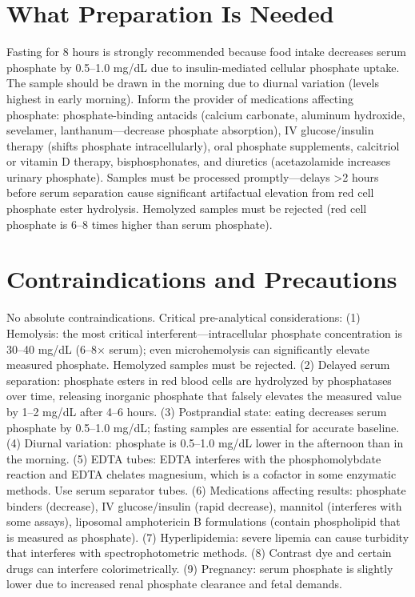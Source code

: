 \section*{What Preparation Is Needed}
Fasting for 8 hours is strongly recommended because food intake decreases serum phosphate by 0.5--1.0 mg/dL due to insulin-mediated cellular phosphate uptake. The sample should be drawn in the morning due to diurnal variation (levels highest in early morning). Inform the provider of medications affecting phosphate: phosphate-binding antacids (calcium carbonate, aluminum hydroxide, sevelamer, lanthanum---decrease phosphate absorption), IV glucose/insulin therapy (shifts phosphate intracellularly), oral phosphate supplements, calcitriol or vitamin D therapy, bisphosphonates, and diuretics (acetazolamide increases urinary phosphate). Samples must be processed promptly---delays >2 hours before serum separation cause significant artifactual elevation from red cell phosphate ester hydrolysis. Hemolyzed samples must be rejected (red cell phosphate is 6--8 times higher than serum phosphate).

\section*{Contraindications and Precautions}
No absolute contraindications. Critical pre-analytical considerations: (1) Hemolysis: the most critical interferent---intracellular phosphate concentration is 30--40 mg/dL (6--8$\times$ serum); even microhemolysis can significantly elevate measured phosphate. Hemolyzed samples must be rejected. (2) Delayed serum separation: phosphate esters in red blood cells are hydrolyzed by phosphatases over time, releasing inorganic phosphate that falsely elevates the measured value by 1--2 mg/dL after 4--6 hours. (3) Postprandial state: eating decreases serum phosphate by 0.5--1.0 mg/dL; fasting samples are essential for accurate baseline. (4) Diurnal variation: phosphate is 0.5--1.0 mg/dL lower in the afternoon than in the morning. (5) EDTA tubes: EDTA interferes with the phosphomolybdate reaction and EDTA chelates magnesium, which is a cofactor in some enzymatic methods. Use serum separator tubes. (6) Medications affecting results: phosphate binders (decrease), IV glucose/insulin (rapid decrease), mannitol (interferes with some assays), liposomal amphotericin B formulations (contain phospholipid that is measured as phosphate). (7) Hyperlipidemia: severe lipemia can cause turbidity that interferes with spectrophotometric methods. (8) Contrast dye and certain drugs can interfere colorimetrically. (9) Pregnancy: serum phosphate is slightly lower due to increased renal phosphate clearance and fetal demands.


